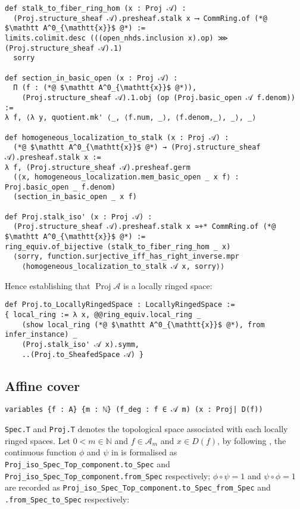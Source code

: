 \documentclass[a4paper,UKenglish,cleveref, autoref, thm-restate]{lipics-v2021}
\begin{document}
\begin{lstlisting}
def stalk_to_fiber_ring_hom (x : Proj 𝒜) :
  (Proj.structure_sheaf 𝒜).presheaf.stalk x ⟶ CommRing.of (*@ $\mathtt A^0_{\mathtt{x}}$ @*) :=
limits.colimit.desc (((open_nhds.inclusion x).op) ⋙ (Proj.structure_sheaf 𝒜).1) 
  sorry

def section_in_basic_open (x : Proj 𝒜) :
  Π (f : (*@ $\mathtt A^0_{\mathtt{x}}$ @*)),
    (Proj.structure_sheaf 𝒜).1.obj (op (Proj.basic_open 𝒜 f.denom)) :=
λ f, ⟨λ y, quotient.mk' ⟨_, ⟨f.num, _⟩, ⟨f.denom,_⟩, _⟩, _⟩

def homogeneous_localization_to_stalk (x : Proj 𝒜) :
  (*@ $\mathtt A^0_{\mathtt{x}}$ @*) → (Proj.structure_sheaf 𝒜).presheaf.stalk x :=
λ f, (Proj.structure_sheaf 𝒜).presheaf.germ
  (⟨x, homogeneous_localization.mem_basic_open _ x f⟩ : Proj.basic_open _ f.denom)
  (section_in_basic_open _ x f)

def Proj.stalk_iso' (x : Proj 𝒜) :
  (Proj.structure_sheaf 𝒜).presheaf.stalk x ≃+* CommRing.of (*@ $\mathtt A^0_{\mathtt{x}}$ @*) :=
ring_equiv.of_bijective (stalk_to_fiber_ring_hom _ x)
  ⟨sorry, function.surjective_iff_has_right_inverse.mpr 
    ⟨homogeneous_localization_to_stalk 𝒜 x, sorry⟩⟩
\end{lstlisting}
Hence establishing that $\operatorname{Proj}\mathcal{A}$ is a locally ringed space:
\begin{lstlisting}
def Proj.to_LocallyRingedSpace : LocallyRingedSpace :=
{ local_ring := λ x, @@ring_equiv.local_ring _
    (show local_ring (*@ $\mathtt A^0_{\mathtt{x}}$ @*), from infer_instance) _
    (Proj.stalk_iso' 𝒜 x).symm,
    ..(Proj.to_SheafedSpace 𝒜) }
\end{lstlisting}

\subsection{Affine cover}
\begin{lstlisting}
variables {f : A} {m : ℕ} (f_deg : f ∈ 𝒜 m) (x : Proj| D(f))
\end{lstlisting}
\lstinline{Spec.T} and \lstinline{Proj.T} denotes the topological space associated with each locally ringed spaces. Let $0 < m \in \mathbb N$ and $f\in\mathcal A_m$ and $x \in D(f)$, by following , the continuous function $\phi$ and $\psi$ in  is formalised as \lstinline{Proj_iso_Spec_Top_component.to_Spec} and \lstinline{Proj_iso_Spec_Top_component.from_Spec} respectively; $\phi\circ\psi = 1$ and $\psi\circ\phi = 1$ are recorded as \lstinline{Proj_iso_Spec_Top_component.to_Spec_from_Spec} and \lstinline{.from_Spec_to_Spec} respectively:
\end{document}

